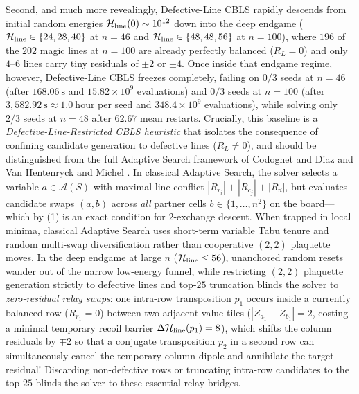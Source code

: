 Second, and much more revealingly, Defective-Line CBLS rapidly descends from initial random energies $\mathcal{H}_{\mathrm{line}}(0) \sim 10^{12}$ down into the deep endgame ($\mathcal{H}_{\mathrm{line}} \in \{24, 28, 40\}$ at $n = 46$ and $\mathcal{H}_{\mathrm{line}} \in \{48, 48, 56\}$ at $n = 100$), where $196$ of the $202$ magic lines at $n = 100$ are already perfectly balanced ($R_L = 0$) and only $4\text{--}6$ lines carry tiny residuals of $\pm 2$ or $\pm 4$. Once inside that endgame regime, however, Defective-Line CBLS freezes completely, failing on $0/3$ seeds at $n = 46$ (after $168.06~\text{s}$ and $15.82\times 10^9$ evaluations) and $0/3$ seeds at $n = 100$ (after $3{,}582.92~\text{s} \approx 1.0~\text{hour}$ per seed and $348.4\times 10^9$ evaluations), while solving only $2/3$ seeds at $n = 48$ after $62.67$ mean restarts. Crucially, this baseline is a \emph{Defective-Line-Restricted CBLS heuristic} that isolates the consequence of confining candidate generation to defective lines ($R_L \ne 0$), and should be distinguished from the full Adaptive Search framework of Codognet and Diaz \cite{codognet2001yet} and Van Hentenryck and Michel \cite{vanhentenryck2005constraint}. In classical Adaptive Search, the solver selects a variable $a \in \mathcal{A}(S)$ with maximal line conflict $|R_{r_i}| + |R_{c_j}| + |R_d|$, but evaluates candidate swaps $(a, b)$ across \emph{all} partner cells $b \in \{1,\dots,n^2\}$ on the board---which by (1) is an exact condition for $2$-exchange descent. When trapped in local minima, classical Adaptive Search uses short-term variable Tabu tenure and random multi-swap diversification rather than cooperative $(2,2)$ plaquette moves. In the deep endgame at large $n$ ($\mathcal{H}_{\mathrm{line}} \le 56$), unanchored random resets wander out of the narrow low-energy funnel, while restricting $(2,2)$ plaquette generation strictly to defective lines and top-$25$ truncation blinds the solver to \emph{zero-residual relay swaps}: one intra-row transposition $p_1$ occurs inside a currently balanced row ($R_{r_1} = 0$) between two adjacent-value tiles ($|Z_{a_1} - Z_{b_1}| = 2$, costing a minimal temporary recoil barrier $\Delta\mathcal{H}_{\mathrm{line}}(p_1) = 8$), which shifts the column residuals by $\mp 2$ so that a conjugate transposition $p_2$ in a second row can simultaneously cancel the temporary column dipole and annihilate the target residual! Discarding non-defective rows or truncating intra-row candidates to the top $25$ blinds the solver to these essential relay bridges.

